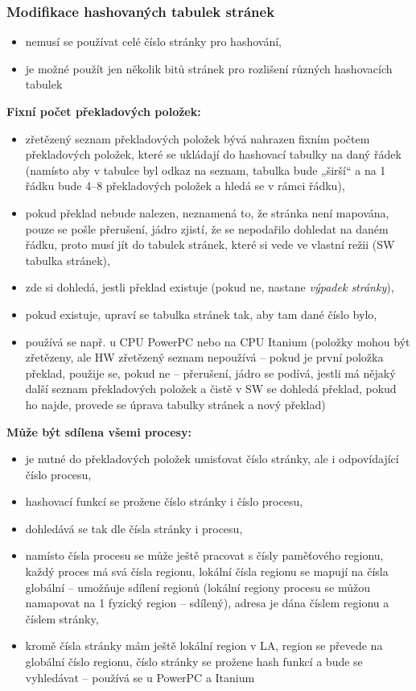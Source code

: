 \documentclass[a4paper, 11pt]{article}
\begin{document}
\subsubsection{Modifikace hashovaných tabulek stránek}
\begin{itemize}
    \item nemusí se používat celé číslo stránky pro hashování,
    \item je možné použít jen několik bitů stránek pro rozlišení různých hashovacích tabulek
\end{itemize}

\textbf{Fixní počet překladových položek:}
\begin{itemize}
    \item zřetězený seznam překladových položek bývá nahrazen fixním počtem překladových položek, které se ukládají do hashovací tabulky na daný řádek (namísto aby v tabulce byl odkaz na seznam, tabulka bude „širší“ a na 1 řádku bude 4--8 překladových položek a hledá se v rámci řádku),
    \item pokud překlad nebude nalezen, neznamená to, že stránka není mapována, pouze se pošle přerušení, jádro zjistí, že se nepodařilo dohledat na daném řádku, proto musí jít do tabulek stránek, které si vede ve vlastní režii (SW tabulka stránek),
    \item zde si dohledá, jestli překlad existuje (pokud ne, nastane \emph{výpadek stránky}),
    \item pokud existuje, upraví se tabulka stránek tak, aby tam dané číslo bylo,
    \item používá se např. u CPU PowerPC nebo na CPU Itanium (položky mohou být zřetězeny, ale HW zřetězený seznam nepoužívá -- pokud je první položka překlad, použije se, pokud ne -- přerušení, jádro se podívá, jestli má nějaký další seznam překladových položek a čistě v SW se dohledá překlad, pokud ho najde, provede se úprava tabulky stránek a nový překlad)
\end{itemize}
 
\textbf{Může být sdílena všemi procesy:}
\begin{itemize}
    \item je nutné do překladových položek umisťovat číslo stránky, ale i odpovídající číslo procesu,
    \item hashovací funkcí se prožene číslo stránky i číslo procesu,
    \item dohledává se tak dle čísla stránky i procesu,
    \item namísto čísla procesu se může ještě pracovat s čísly paměťového regionu, každý proces má svá čísla regionu, lokální čísla regionu se mapují na čísla globální -- umožňuje sdílení regionů (lokální regiony procesu se můžou namapovat na 1 fyzický region -- sdílený), adresa je dána číslem regionu a číslem stránky,
    \item kromě čísla stránky mám ještě lokální region v LA, region se převede na globální číslo regionu, číslo stránky se prožene hash funkcí a bude se vyhledávat -- používá se u PowerPC a Itanium
\end{itemize}
 
\end{document}
